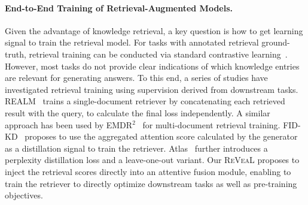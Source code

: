 \documentclass[10pt,twocolumn,letterpaper]{article}
\newcommand{\method}{R\textsc{e}V\textsc{ea}L\xspace}
\begin{document}
\paragraph{End-to-End Training of Retrieval-Augmented Models.}
Given the advantage of knowledge retrieval, a key question is how to get learning signal to train the retrieval model. For tasks with annotated retrieval ground-truth, retrieval training can be conducted via standard contrastive learning~\cite{DBLP:journals/corr/abs-2004-04906}. However, most tasks do not provide clear indications of which knowledge entries are relevant for generating answers. To this end, a series of studies have investigated retrieval training using supervision derived from downstream tasks.
REALM~\cite{DBLP:journals/corr/abs-2002-08909} trains a single-document retriever by concatenating each retrieved result with the query, to calculate the final loss independently. A similar approach has been used by EMDR$^2$~\cite{DBLP:conf/nips/SachanRHDY21F} for multi-document retrieval training. FID-KD~\cite{izacard2020distilling} proposes to use the aggregated attention score calculated by the generator as a distillation signal to train the retriever. Atlas~\cite{DBLP:journals/corr/abs-2208-03299} further introduces a perplexity distillation loss and a leave-one-out variant. Our \method proposes to inject the retrieval scores directly into an attentive fusion module, enabling to train the retriever to directly optimize downstream tasks as well as pre-training objectives. 
\end{document}
